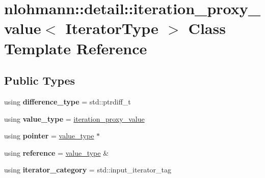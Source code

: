 \hypertarget{classnlohmann_1_1detail_1_1iteration__proxy__value}{}\section{nlohmann\+:\+:detail\+:\+:iteration\+\_\+proxy\+\_\+value$<$ Iterator\+Type $>$ Class Template Reference}
\label{classnlohmann_1_1detail_1_1iteration__proxy__value}
\subsection*{Public Types}
\begin{DoxyCompactItemize}
\item 
\mbox{\label{classnlohmann_1_1detail_1_1iteration__proxy__value_ada6b4e6d55d8ed7ac79e49a03e9d1fe2}} 
using {\bfseries difference\+\_\+type} = std\+::ptrdiff\+\_\+t
\item 
\mbox{\label{classnlohmann_1_1detail_1_1iteration__proxy__value_a5e90a5810cc1bb6c1000eabbfdfe7b9e}} 
using {\bfseries value\+\_\+type} = \hyperlink{classnlohmann_1_1detail_1_1iteration__proxy__value}{iteration\+\_\+proxy\+\_\+value}
\item 
\mbox{\label{classnlohmann_1_1detail_1_1iteration__proxy__value_a44c64feee85b8e7164a05310e6418a4b}} 
using {\bfseries pointer} = \hyperlink{classnlohmann_1_1detail_1_1iteration__proxy__value}{value\+\_\+type} $\ast$
\item 
\mbox{\label{classnlohmann_1_1detail_1_1iteration__proxy__value_a5bc7d3133daab5ec4797f3132e093af8}} 
using {\bfseries reference} = \hyperlink{classnlohmann_1_1detail_1_1iteration__proxy__value}{value\+\_\+type} \&
\item 
\mbox{\label{classnlohmann_1_1detail_1_1iteration__proxy__value_a1ab8c44e3772c03651b5ad07216043cf}} 
using {\bfseries iterator\+\_\+category} = std\+::input\+\_\+iterator\+\_\+tag
\end{DoxyCompactItemize}
